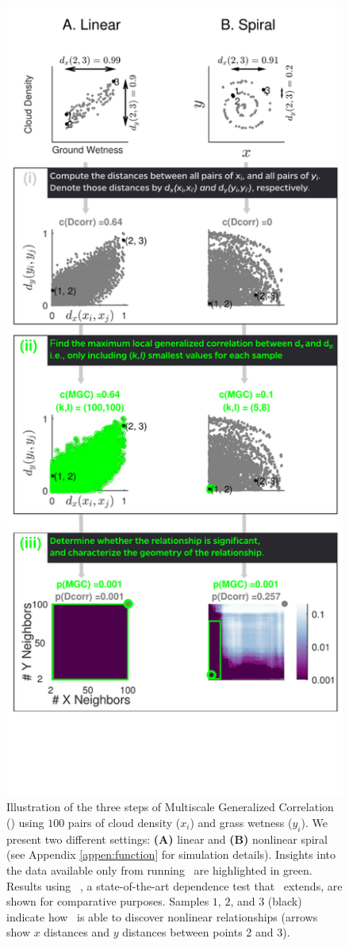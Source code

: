 \documentclass[11pt]{article}
\begin{document}
\begin{figure}
\includegraphics[width=0.54\linewidth]{Figures/Fig1Allb.pdf}
\caption{
Illustration of the three steps of Multiscale Generalized Correlation (\Mgc)  using  $100$ pairs of cloud density ($x_i$) and grass wetness ($y_i$). 
We present two different settings: \textbf{(A)} linear  and \textbf{(B)} nonlinear spiral  (see Appendix \ref{appen:function} for simulation details). 
Insights into the data available only from running \Mgc~are highlighted in {\color{green}green.}  Results using \Dcorr~\cite{SzekelyRizzo2009}, a state-of-the-art dependence test that \Mgc~extends, are shown for comparative purposes. 
% 
Samples $1$, $2$, and $3$ (black) indicate how \Mgc~is able to discover nonlinear relationships (arrows show $x$ distances and $y$ distances between points 2 and 3). 
}
\end{figure}
\end{document}

